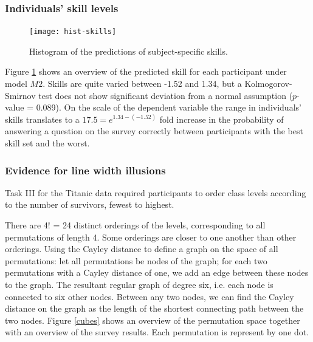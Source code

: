 \subsubsection*{Individuals' skill levels}
\begin{figure}
\centering \texttt{[image: hist-skills]}
\caption{\label{skills}Histogram of the predictions of subject-specific skills. }
\vspace{-0.2in}
\end{figure}	
Figure \ref{skills} shows an overview of the predicted skill for each participant under model $M2$. Skills are quite varied between  -1.52 and  1.34, but
a Kolmogorov-Smirnov test  does not show significant deviation from a normal assumption ($p$-value = 0.089).
On the scale of the dependent variable the range in individuals' skills translates to a $17.5 = e^{1.34 - (-1.52)}$ fold increase in the probability of answering a question on the survey correctly between participants with the best skill set and the worst.


\subsubsection*{Evidence for line width illusions}

Task III for the Titanic data required participants to order  class levels  according to the number of survivors, fewest to highest. 




There are 4! = 24 distinct orderings of the levels, corresponding to all permutations of length 4. Some orderings are closer to one another than other orderings. Using the Cayley distance to define a graph on the space of all permutations: let all permutations be nodes of the graph; for each two permutations with a Cayley distance of one, we add an edge between these nodes to the graph. The resultant regular graph of degree six, i.e. each  node is connected to six other nodes. Between any two nodes, we can find the Cayley distance on the graph as the length of the shortest connecting path between the two nodes.
Figure \ref{cubes} shows an overview of the permutation space together with an overview of the survey results. Each permutation is represent by one dot. 

